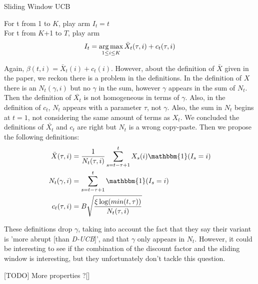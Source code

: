 \begin{algorithm}
    \caption{Sliding Window UCB}
    \label{alg:sw_ucb}
    For t from 1 to $K$, play arm $I_t = t$ \\
    For t from $K$+1 to $T$, play arm 
    $$ I_t = \operatorname*{arg\,max}_{1\leq i \leq K} \bar X_t(\tau,i) + c_t(\tau,i)$$
\end{algorithm}

Again, $\beta(t,i)=\bar{X}_t(i)+c_t(i)$.
However, about the definition of $\bar{X}$ given in the paper, we reckon there is a problem in the definitions. In the definition of $X$ there is an $N_t(\gamma, i)$ but no $\gamma$ in the sum, however $\gamma$ appears in the sum of $N_t$. Then the definition of $\bar{X_t}$ is not homogeneous in terms of $\gamma$. Also, in the definition of $c_t$, $N_t$ appears with a parameter $\tau$, not $\gamma$. Also, the sum in $N_t$ begins at $t=1$, not considering the same amount of terms as $X_t$. We concluded the definitions of $\bar{X_t}$ and $c_t$ are right but $N_t$ is a wrong copy-paste. Then we propose the following definitions:
\begin{align}
\bar{X}(\tau, i) &= \frac{1}{N_t(\tau, i)}\sum_{s=t-\tau+1}^t X_s(i)\mathbbm{1}(I_s=i) \\
N_t(\gamma, i) &= \sum_{s=t-\tau+1}^t \mathbbm{1}(I_s=i) \\
c_t(\tau, i) &= B\sqrt{\frac{\xi \log(min(t, \tau))}{N_t(\tau,i)}}
\end{align}

These definitions drop $\gamma$, taking into account the fact that they say their variant is 'more abrupt [than \textit{D-UCB}]', and that $\gamma$ only appears in $N_t$. However, it could be interesting to see if the combination of the discount factor and the sliding window is interesting, but they unfortunately don't tackle this question.

[TODO] More properties ?[]